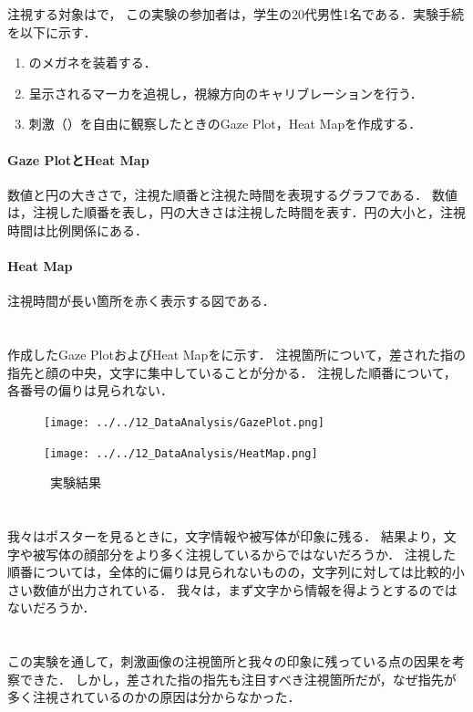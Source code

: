 注視する対象はで，
この実験の参加者は，学生の20代男性1名である．実験手続を以下に示す．
\begin{enumerate}
    \renewcommand{\labelenumi}{\fbox{\theenumi}}
    \item \tobi のメガネを装着する．
    \item 呈示されるマーカを追視し，視線方向のキャリブレーションを行う．
    \item 刺激（）を自由に観察したときのGaze Plot，Heat Mapを作成する．
\end{enumerate}
\paragraph{Gaze PlotとHeat Map}
数値と円の大きさで，注視た順番と注視た時間を表現するグラフである．
数値は，注視した順番を表し，円の大きさは注視した時間を表す．円の大小と，注視時間は比例関係にある．
\paragraph{Heat Map}
注視時間が長い箇所を赤く表示する図である．
\clearpage
\section{\result}
作成したGaze PlotおよびHeat Mapをに示す．
注視箇所について，差された指の指先と顔の中央，文字に集中していることが分かる．
注視した順番について，各番号の偏りは見られない．
\begin{figure}[H]
    \centering
    \begin{minipage}[b]{.48\textwidth}
        \centering
        \texttt{[image: ../../12\_DataAnalysis/GazePlot.png]}
    \end{minipage}
    \begin{minipage}[b]{.48\textwidth}
        \centering
        \texttt{[image: ../../12\_DataAnalysis/HeatMap.png]}
    \end{minipage}
    \caption{\kadaid \ 実験結果}
    \label{fig:実験結果\kadaid}
\end{figure}
\section{\consideration}
我々はポスターを見るときに，文字情報や被写体が印象に残る．
結果より，文字や被写体の顔部分をより多く注視しているからではないだろうか．
注視した順番については，全体的に偏りは見られないものの，文字列に対しては比較的小さい数値が出力されている．
我々は，まず文字から情報を得ようとするのではないだろうか．
\section{\conclusion}
この実験を通して，刺激画像の注視箇所と我々の印象に残っている点の因果を考察できた．
しかし，差された指の指先も注目すべき注視箇所だが，なぜ指先が多く注視されているのかの原因は分からなかった．